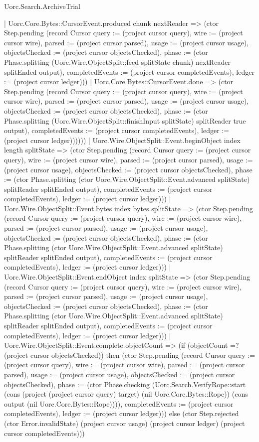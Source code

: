 \begin{lexlean}{Uorc.Search.ArchiveTrial}
\begin{semanticmodule}
{{{              | Uorc.Core.Bytes::CursorEvent.produced chunk nextReader => (ctor Step.pending (record Cursor {query := (project cursor query), wire := (project cursor wire), parsed := (project cursor parsed), usage := (project cursor usage), objectsChecked := (project cursor objectsChecked), phase := (ctor Phase.splitting (Uorc.Wire.ObjectSplit::feed splitState chunk) nextReader splitEnded output), completedEvents := (project cursor completedEvents), ledger := (project cursor ledger)}))
              | Uorc.Core.Bytes::CursorEvent.done => (ctor Step.pending (record Cursor {query := (project cursor query), wire := (project cursor wire), parsed := (project cursor parsed), usage := (project cursor usage), objectsChecked := (project cursor objectsChecked), phase := (ctor Phase.splitting (Uorc.Wire.ObjectSplit::finishInput splitState) splitReader true output), completedEvents := (project cursor completedEvents), ledger := (project cursor ledger)})))))
          | Uorc.Wire.ObjectSplit::Event.beginObject index length splitState => (ctor Step.pending (record Cursor {query := (project cursor query), wire := (project cursor wire), parsed := (project cursor parsed), usage := (project cursor usage), objectsChecked := (project cursor objectsChecked), phase := (ctor Phase.splitting (ctor Uorc.Wire.ObjectSplit::Event.advanced splitState) splitReader splitEnded output), completedEvents := (project cursor completedEvents), ledger := (project cursor ledger)}))
          | Uorc.Wire.ObjectSplit::Event.bytes index bytes splitState => (ctor Step.pending (record Cursor {query := (project cursor query), wire := (project cursor wire), parsed := (project cursor parsed), usage := (project cursor usage), objectsChecked := (project cursor objectsChecked), phase := (ctor Phase.splitting (ctor Uorc.Wire.ObjectSplit::Event.advanced splitState) splitReader splitEnded output), completedEvents := (project cursor completedEvents), ledger := (project cursor ledger)}))
          | Uorc.Wire.ObjectSplit::Event.endObject index splitState => (ctor Step.pending (record Cursor {query := (project cursor query), wire := (project cursor wire), parsed := (project cursor parsed), usage := (project cursor usage), objectsChecked := (project cursor objectsChecked), phase := (ctor Phase.splitting (ctor Uorc.Wire.ObjectSplit::Event.advanced splitState) splitReader splitEnded output), completedEvents := (project cursor completedEvents), ledger := (project cursor ledger)}))
          | Uorc.Wire.ObjectSplit::Event.complete objectCount => (if (objectCount =? (project cursor objectsChecked)) then (ctor Step.pending (record Cursor {query := (project cursor query), wire := (project cursor wire), parsed := (project cursor parsed), usage := (project cursor usage), objectsChecked := (project cursor objectsChecked), phase := (ctor Phase.checking (Uorc.Search.VerifyRope::start (cons (project (project cursor query) target) (nil Uorc.Core.Bytes::Rope)) (cons output (nil Uorc.Core.Bytes::Rope)))), completedEvents := (project cursor completedEvents), ledger := (project cursor ledger)})) else (ctor Step.rejected (ctor Error.invalidState) (project cursor usage) (project cursor ledger) (project cursor completedEvents)))
}}}
\end{semanticmodule}
\end{lexlean}
